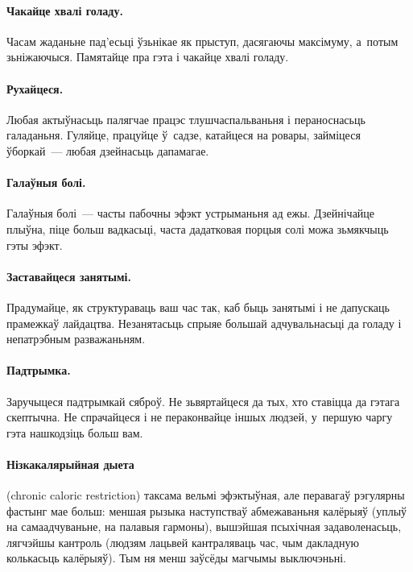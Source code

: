 
\paragraph{Чакайце хвалі голаду.}
Часам жаданьне пад'есьці ўзьнікае як прыступ, дасягаючы максімуму, а~потым зьніжаючыся. Памятайце пра гэта і чакайце хвалі голаду.

\paragraph{Рухайцеся.}
Любая актыўнасьць палягчае працэс тлушчаспальваньня і пераноснасьць галаданьня. Гуляйце, працуйце ў~садзе, катайцеся на ровары, займіцеся ўборкай~--- любая дзейнасьць дапамагае.

\paragraph{Галаўныя болі.}
Галаўныя болі~--- часты пабочны эфэкт устрыманьня ад ежы. Дзейнічайце плыўна, піце больш вадкасьці, часта дадатковая порцыя солі можа зьмякчыць гэты эфэкт.

\paragraph{Заставайцеся занятымі.}
Прадумайце, як структураваць ваш час так, каб быць занятымі і не дапускаць прамежкаў лайдацтва. Незанятасьць спрыяе большай адчувальнасьці да голаду і непатрэбным разважаньням.

\paragraph{Падтрымка.}
Заручыцеся падтрымкай сяброў. Не зьвяртайцеся да тых, хто ставіцца да гэтага скептычна. Не спрачайцеся і не пераконвайце іншых людзей, у~першую чаргу гэта нашкодзіць больш вам.

\paragraph{Нізкакалярыйная дыета} (chronic caloric restriction) таксама вельмі эфэктыўная, але перавагаў рэгулярны фастынг мае больш: меншая рызыка наступстваў абмежаваньня калёрыяў (уплыў на самаадчуваньне, на палавыя гармоны), вышэйшая псыхічная задаволенасьць, лягчэйшы кантроль (людзям лацьвей кантраляваць час, чым дакладную колькасьць калёрыяў). Тым ня менш заўсёды магчымы выключэньні.


